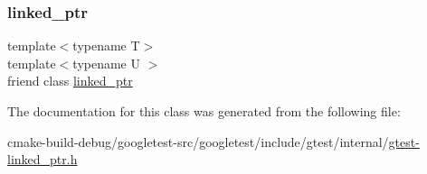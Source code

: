 \subsubsection{\texorpdfstring{linked\_ptr}{linked\_ptr}}
{\footnotesize\ttfamily template$<$typename T$>$ \\
template$<$typename U $>$ \\
friend class \mbox{\hyperlink{classtesting_1_1internal_1_1linked__ptr}{linked\+\_\+ptr}}\hspace{0.3cm}{\ttfamily [friend]}}



The documentation for this class was generated from the following file\+:\begin{DoxyCompactItemize}
\item 
cmake-\/build-\/debug/googletest-\/src/googletest/include/gtest/internal/\mbox{\hyperlink{gtest-linked__ptr_8h}{gtest-\/linked\+\_\+ptr.\+h}}\end{DoxyCompactItemize}
